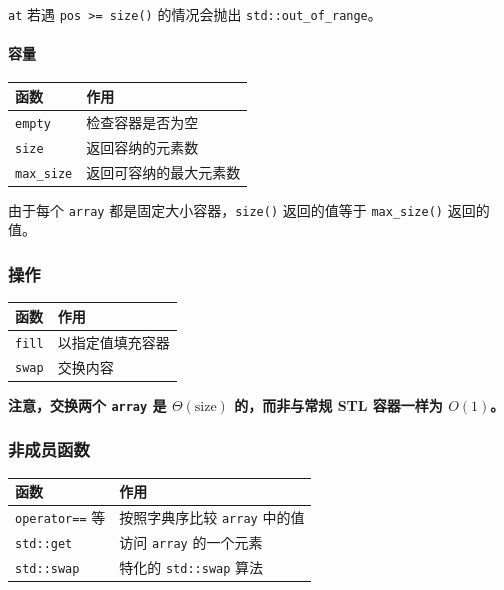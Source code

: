 \texttt{at} 若遇 \texttt{pos\ \textgreater{}=\ size()} 的情况会抛出 \texttt{std::out\_of\_range}。

\paragraph{容量}\label{ux5bb9ux91cf}

{\def\LTcaptype{none} %
\begin{longtable}[]{@{}ll@{}}
\toprule\noalign{}
函数 & 作用 \\
\midrule\noalign{}
\endhead
\bottomrule\noalign{}
\endlastfoot
\texttt{empty} & 检查容器是否为空 \\
\texttt{size} & 返回容纳的元素数 \\
\texttt{max\_size} & 返回可容纳的最大元素数 \\
\end{longtable}
}

由于每个 \texttt{array} 都是固定大小容器，\texttt{size()} 返回的值等于 \texttt{max\_size()} 返回的值。

\subsubsection{操作}\label{ux64cdux4f5c}

{\def\LTcaptype{none} %
\begin{longtable}[]{@{}ll@{}}
\toprule\noalign{}
函数 & 作用 \\
\midrule\noalign{}
\endhead
\bottomrule\noalign{}
\endlastfoot
\texttt{fill} & 以指定值填充容器 \\
\texttt{swap} & 交换内容 \\
\end{longtable}
}

\textbf{注意，交换两个 \texttt{array} 是 \(\Theta(\text{size})\) 的，而非与常规 STL 容器一样为 \(O(1)\)。}

\subsubsection{非成员函数}\label{ux975eux6210ux5458ux51fdux6570}

{\def\LTcaptype{none} %
\begin{longtable}[]{@{}ll@{}}
\toprule\noalign{}
函数 & 作用 \\
\midrule\noalign{}
\endhead
\bottomrule\noalign{}
\endlastfoot
\texttt{operator==} 等 & 按照字典序比较 \texttt{array} 中的值 \\
\texttt{std::get} & 访问 \texttt{array} 的一个元素 \\
\texttt{std::swap} & 特化的 \texttt{std::swap} 算法 \\
\end{longtable}
}

